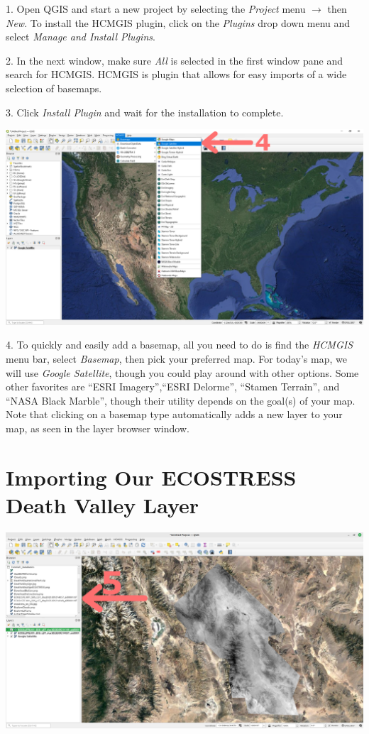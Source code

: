 \documentclass[oneside,a4paper,11pt,explicit]{book}
\begin{document}
1. Open QGIS and start a new project by selecting the \textit{Project} menu $\rightarrow$ then \textit{New}. To install the HCMGIS plugin, click on the \textit{Plugins} drop down menu and select \textit{Manage and Install Plugins}.

2. In the next window, make sure \textit{All} is selected in the first window pane and search for HCMGIS. HCMGIS is plugin that allows for easy imports of a wide selection of basemaps.

3. Click \textit{Install Plugin} and wait for the installation to complete.

\vspace{1em}

\centerline{\includegraphics[width=\textwidth]{GoogleBasemap.png}}

\vspace{1em}

4. To quickly and easily add a basemap, all you need to do is find the \textit{HCMGIS} menu bar, select \textit{Basemap}, then pick your preferred map. For today's map, we will use \textit{Google Satellite}, though you could play around with other options. Some other favorites are ``ESRI Imagery'',``ESRI Delorme'', ``Stamen Terrain'', and ``NASA Black Marble'', though their utility depends on the goal(s) of your map. Note that clicking on a basemap type automatically adds a new layer to your map, as seen in the layer browser window.

\section{Importing Our ECOSTRESS Death Valley Layer}

\vspace{1em}

\centerline{\includegraphics[width=\textwidth]{ImportLST.png}}
\end{document}
